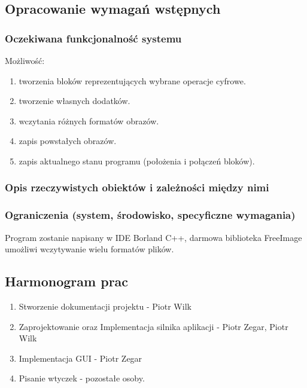 \documentclass[a4paper,10pt]{article}
\begin{document}
\subsection{Opracowanie wymagań wstępnych}
\subsubsection{Oczekiwana funkcjonalność systemu}
Możliwość:
\begin{enumerate}
 \item tworzenia bloków reprezentujących wybrane operacje cyfrowe.
 \item tworzenie własnych dodatków.
 \item wczytania różnych formatów obrazów.
 \item zapis powstałych obrazów.
 \item zapis aktualnego stanu programu (położenia i połączeń bloków).
\end{enumerate}
\subsubsection{Opis rzeczywistych obiektów i zależności między nimi}

\subsubsection{Ograniczenia (system, środowisko, specyficzne wymagania)}
Program zostanie napisany w IDE Borland C++, darmowa biblioteka FreeImage umożliwi wczytywanie wielu formatów plików.
\subsection{Harmonogram prac}
\begin{enumerate}
 \item Stworzenie dokumentacji projektu - Piotr Wilk
 \item Zaprojektowanie oraz Implementacja silnika aplikacji - Piotr Zegar, Piotr Wilk
 \item Implementacja GUI - Piotr Zegar
 \item Pisanie wtyczek - pozostałe osoby.
\end{enumerate}
\end{document}
